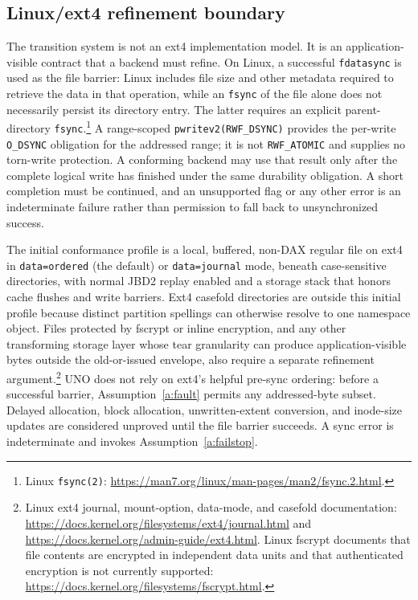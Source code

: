 \documentclass[10pt,twocolumn]{article}
\theoremstyle{remark}
\newcommand{\code}[1]{\texttt{#1}}
\begin{document}
\subsection{Linux/ext4 refinement boundary}

The transition system is not an ext4 implementation model. It is an application-visible contract
that a backend must refine. On Linux, a successful \code{fdatasync} is used as the file barrier:
Linux includes file size and other metadata required to retrieve the data in that operation, while
an \code{fsync} of the file alone does not necessarily persist its directory entry. The latter
requires an explicit parent-directory \code{fsync}.\footnote{Linux \code{fsync(2)}:
\url{https://man7.org/linux/man-pages/man2/fsync.2.html}.} A range-scoped
\code{pwritev2(RWF\_DSYNC)} provides the per-write \code{O\_DSYNC} obligation for the addressed
range; it is not \code{RWF\_ATOMIC} and supplies no torn-write protection. A conforming backend may
use that result only after the complete logical write has finished under the same durability
obligation. A short completion must be continued, and an unsupported flag or any other error is an
indeterminate failure rather than permission to fall back to unsynchronized success.

The initial conformance profile is a local, buffered, non-DAX regular file on ext4 in
\code{data=ordered} (the default) or \code{data=journal} mode, beneath case-sensitive directories,
with normal JBD2 replay enabled and a storage stack that honors cache flushes and write barriers.
Ext4 casefold directories are outside this initial profile because distinct partition spellings can
otherwise resolve to one namespace object. Files protected by fscrypt or inline encryption, and any
other transforming storage layer whose tear granularity can produce application-visible bytes
outside the old-or-issued envelope, also require a separate refinement argument.\footnote{Linux
ext4 journal, mount-option, data-mode, and casefold documentation:
\url{https://docs.kernel.org/filesystems/ext4/journal.html} and
\url{https://docs.kernel.org/admin-guide/ext4.html}. Linux fscrypt documents that file contents are
encrypted in independent data units and that authenticated encryption is not currently supported:
\url{https://docs.kernel.org/filesystems/fscrypt.html}.} UNO does not rely on ext4's helpful pre-sync
ordering: before a successful barrier, Assumption~\ref{a:fault} permits any addressed-byte subset.
Delayed allocation, block allocation, unwritten-extent conversion, and inode-size updates
are considered unproved until the file barrier succeeds. A sync error is indeterminate and invokes
Assumption~\ref{a:failstop}.
\end{document}
